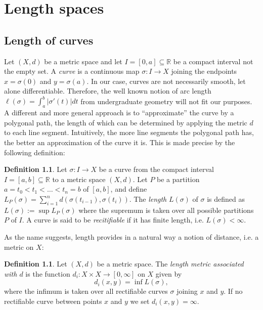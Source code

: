 \documentclass[11pt, a4paper, oneside]{memoir}
\theoremstyle{plain}\newtheorem{theorem}[subsection]{Theorem}
\theoremstyle{definition}
\newtheorem{definition}[subsection]{Definition}
\newcommand{\R}{\mathbb{R}}
\begin{document}
\chapter{Length spaces}
\section{Length of curves}
Let \((X,d)\) be a metric space and let \(I=[0,a]\subseteq\R\) be a compact interval not the empty set. 
A \emph{curve} is a continuous map \(\sigma:I\to X\) joining the endpoints \(x=\sigma(0)\) and \(y=\sigma(a)\).
In our case, curves are not necessarily smooth, let alone differentiable.
Therefore, the well known notion of arc length \(\ell(\sigma)=\int_a^b|\sigma'(t)|dt\) from undergraduate geometry will not fit our purposes.
A different and more general approach is to ``approximate'' the curve by a polygonal path, the length of which can be determined by applying the metric \(d\) to each line segment.
Intuitively, the more line segments the polygonal path has, the better an approximation of the curve it is.
This is made precise by the following definition:

\begin{definition}
\label{length}
Let \(\sigma:I\to X\) be a curve from the compact interval \(I=[a,b]\subseteq \R\) to a metric space \((X,d)\).
Let \(P\) be a partition \(a=t_0<t_1<\ldots<t_n=b\) of \([a,b]\), and define \(L_P(\sigma)=\sum_{i=1}^n d(\sigma(t_{i-1}),\sigma(t_i))\).
The \emph{length} \(L(\sigma)\) of \(\sigma\) is defined as
$L(\sigma):=\sup L_P(\sigma)$
where the supremum is taken over all possible partitions \(P\) of \(I\).
A curve is said to be \textit{recitifiable} if it has finite length, i.e. \(L(\sigma)<\infty\).
\end{definition}

\medskip
As the name suggests, length provides in a natural way a notion of distance, i.e. a metric on \(X\):
\begin{definition}
Let \((X,d)\) be a metric space.
The \textit{length metric associated with $d$} is the function \(d_i:X\times X\to [0,\infty]\) on \(X\) given by
\[d_i(x,y)=\inf L(\sigma),\]
where the infimum is taken over all rectifiable curves \(\sigma\) joining \(x\) and \(y\). 
If no rectifiable curve between points \(x\) and \(y\) we set \(d_i(x,y)=\infty\).
\end{definition}
\end{document}
